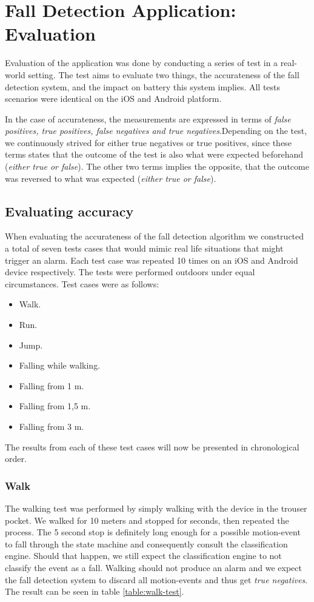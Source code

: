 \documentclass[12pt, a4paper, onecolumn]{article}
\begin{document}
	
	\newpage
	
	\section{Fall Detection Application: Evaluation} \label{section:application-evaluation}
		Evaluation of the application was done by conducting a series of test in a real-world setting. The test aims to evaluate two things, the accurateness of the fall detection system, and the impact on battery this system implies. All tests scenarios were identical on the iOS and Android platform. 
	
	In the case of accurateness, the measurements are expressed in terms of \textit{false positives, true positives, false negatives and true negatives}.Depending on the test, we continuously strived for either true negatives or true positives, since these terms states that the outcome of the test is also what were expected  beforehand (\textit{either true or false}). The other two terms implies the opposite, that the outcome was reversed to what was expected (\textit{either true or false}).
	
	
	
	\subsection{Evaluating accuracy} 
	When evaluating the accurateness of the fall detection algorithm we constructed a total of seven tests cases that would mimic real life situations that might trigger an alarm. Each test case was repeated 10 times on an iOS and Android device respectively. The tests were performed outdoors under equal circumstances. Test cases were as follows:
	\begin{itemize}
		\item Walk.
		\item Run.
		\item Jump.
		\item Falling while walking.
		\item Falling from 1 m.
		\item Falling from 1,5 m.
		\item Falling from 3 m.
	\end{itemize}
	
	
	The results from each of these test cases will now be presented in chronological order. 
	
	\subsubsection{Walk} 
	\label{section:walking-test}
	The walking test was performed by simply walking with the device in the trouser pocket. We walked for 10 meters and stopped for  seconds, then repeated the process. The 5 second stop is definitely long enough for a possible motion-event to fall through the state machine and consequently consult the classification engine. Should that happen, we still expect the classification engine to not classify the event as a fall. Walking should not produce an alarm and we expect the fall detection system to discard all motion-events and thus get \textit{true negatives}. The result can be seen in table \ref{table:walk-test}. 
	
\end{document}
